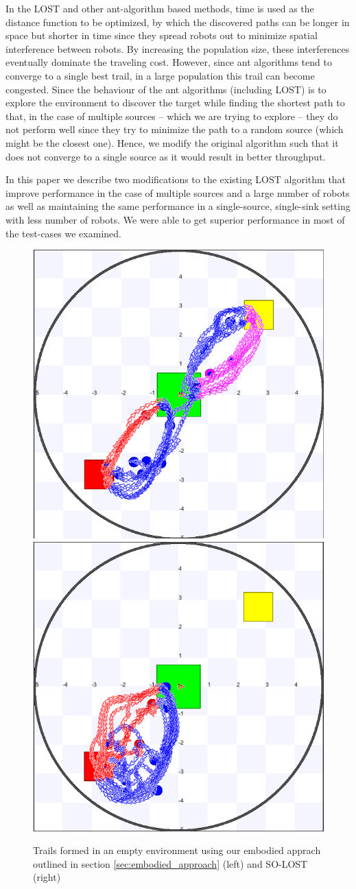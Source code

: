 \documentclass[letterpaper, 10 pt, conference]{ieeeconf}  %
\begin{document}
In the LOST and other ant-algorithm based methods, time is used as the distance function to be optimized, by which the discovered paths can be longer in space but shorter in time since they spread robots out to minimize spatial interference between robots. By increasing the population size, these interferences eventually dominate the traveling cost. However, since ant algorithms tend to converge to a single best trail, in a large population this trail can become congested. Since the behaviour of the ant algorithms (including LOST) is to explore the environment to discover the target while finding the shortest path to that, in the case of multiple sources -- which we are trying to explore -- they do not perform well since they try to minimize the path to a random source (which might be the closest one). Hence, we modify the original algorithm such that it does not converge to a single source as it would result in better throughput.

In this paper we describe two modifications to the existing LOST algorithm that improve performance in the case of multiple sources and a large number of robots as well as maintaining the same performance in a single-source, single-sink setting with less number of robots. We were able to get superior performance in most of the test-cases we examined.

\begin{figure}
   \includegraphics[width=0.49\linewidth]{embodied.png}
   \includegraphics[width=0.49\linewidth]{SO_LOST.png}
   \centering
   \caption{Trails formed in an empty environment using our embodied apprach outlined in section \ref{sec:embodied_approach} (left) and SO-LOST (right)}
   \label{fig:grid_visualization}
\end{figure}
\end{document}
